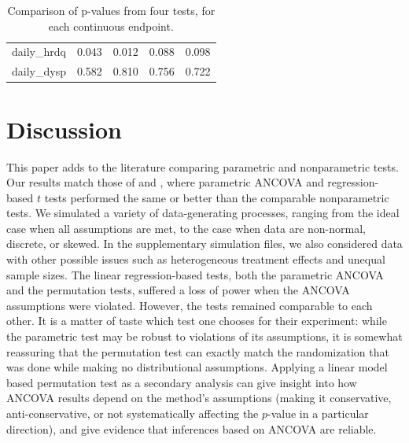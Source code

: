 \documentclass[12pt]{article}
\begin{document}
\begin{table}[]
\begin{tabular}{l|cccc}
daily\_hrdq   & 0.043                      & 0.012                                                                                & 0.088                                                                        & 0.098                                                                        \\
daily\_dysp   & 0.582                      & 0.810                                                                                & 0.756                                                                        & 0.722                                                                        \\
\hline
\end{tabular}
\caption{Comparison of p-values from four tests, for each continuous endpoint.} 
\end{table}

\section{Discussion}\label{sec:discussion}

This paper adds to the literature comparing parametric and nonparametric tests.
Our results match those of \citet{vickers_parametric_2005} and \citet{anderson_empirical_1999}, where parametric ANCOVA and regression-based $t$ tests performed the same or better than the comparable nonparametric tests.
We simulated a variety of data-generating processes, ranging from the ideal case when all assumptions are met, 
to the case when data are non-normal, discrete, or skewed.
In the supplementary simulation files, we also considered data with other possible issues such as heterogeneous treatment effects and unequal sample sizes.
The linear regression-based tests, both the parametric ANCOVA and the permutation tests, suffered a loss of power when the ANCOVA assumptions were violated.
However, the tests remained comparable to each other.
It is a matter of taste which test one chooses for their experiment: while the parametric test may be robust to violations of its assumptions, it is somewhat reassuring that the permutation test can exactly match the randomization that was done while making no distributional assumptions.
Applying a linear model based permutation test as a secondary analysis can give insight into how ANCOVA results depend on the method's assumptions
(making it conservative, anti-conservative, or not systematically affecting the $p$-value in a particular direction),
and give evidence that inferences based on ANCOVA are reliable.
\end{document}
